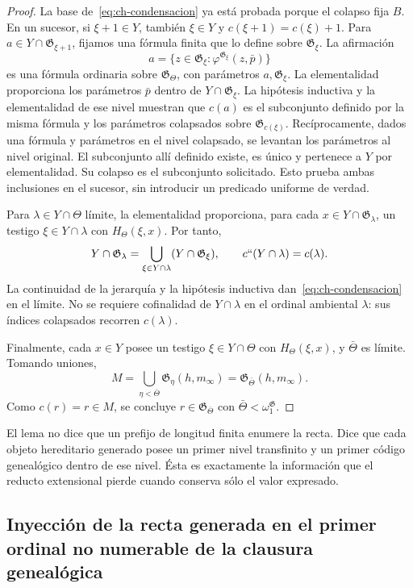 \begin{proof}
La base de~\eqref{eq:ch-condensacion} ya está probada porque el colapso fija \(B\). En un
sucesor, si \(\xi+1\in Y\), también \(\xi\in Y\) y
\(c(\xi+1)=c(\xi)+1\). Para
\(a\in Y\cap\mathfrak G_{\xi+1}\), fijamos una fórmula finita que lo
define sobre \(\mathfrak G_\xi\). La afirmación
\[
 a=\{z\in\mathfrak G_\xi:
                  \varphi^{\mathfrak G_\xi}(z,\bar p)\}
\]
es una fórmula ordinaria sobre \(\mathfrak G_\Theta\), con parámetros
\(a,\mathfrak G_\xi\). La elementalidad proporciona los parámetros
\(\bar p\) dentro de \(Y\cap\mathfrak G_\xi\). La hipótesis inductiva
y la elementalidad de ese nivel muestran que \(c(a)\) es el subconjunto
definido por la misma fórmula y los parámetros colapsados sobre
\(\mathfrak G_{c(\xi)}\). Recíprocamente, dados una fórmula y parámetros
en el nivel colapsado, se levantan los parámetros al nivel original.
El subconjunto allí definido existe, es único y pertenece a \(Y\) por
elementalidad. Su colapso es el subconjunto solicitado. Esto prueba ambas
inclusiones en el sucesor, sin introducir un predicado uniforme de verdad.

Para \(\lambda\in Y\cap\Theta\) límite, la elementalidad proporciona,
para cada \(x\in Y\cap\mathfrak G_\lambda\), un testigo
\(\xi\in Y\cap\lambda\) con \(H_\Theta(\xi,x)\). Por tanto,
\[
 Y\cap\mathfrak G_\lambda
 =\bigcup_{\xi\in Y\cap\lambda}(Y\cap\mathfrak G_\xi),
 \qquad c``(Y\cap\lambda)=c(\lambda).
\]
La continuidad de la jerarquía y la hipótesis inductiva dan~\eqref{eq:ch-condensacion} en el
límite. No se requiere cofinalidad de \(Y\cap\lambda\) en el ordinal
ambiental \(\lambda\): sus índices colapsados recorren \(c(\lambda)\).

Finalmente, cada \(x\in Y\) posee un testigo \(\xi\in Y\cap\Theta\)
con \(H_\Theta(\xi,x)\), y \(\bar\Theta\) es límite. Tomando uniones,
\[
 M=\bigcup_{\eta<\bar\Theta}\mathfrak G_\eta(h,m_\infty)
  =\mathfrak G_{\bar\Theta}(h,m_\infty).
\]
Como \(c(r)=r\in M\), se concluye
\(r\in\mathfrak G_{\bar\Theta}\) con
\(\bar\Theta<\omega_1^{\mathfrak G}\).
\end{proof}

El lema no dice que un prefijo de longitud finita enumere la recta. Dice que
cada objeto hereditario generado posee un primer nivel transfinito y un primer
código genealógico dentro de ese nivel. Ésta es exactamente la información que
el reducto extensional pierde cuando conserva sólo el valor expresado.

\subsection{Inyección de la recta generada en el primer ordinal no numerable de la clausura genealógica}

